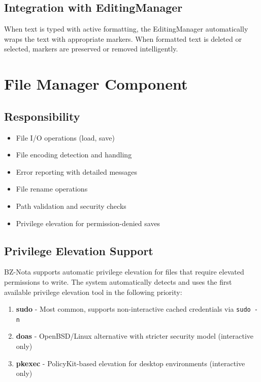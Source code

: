 \documentclass[12pt,a4paper,oneside,openany]{report}
\begin{document}
\subsection{Integration with EditingManager}

When text is typed with active formatting, the EditingManager automatically wraps the text with appropriate markers. When formatted text is deleted or selected, markers are preserved or removed intelligently.

\section{File Manager Component}

\subsection{Responsibility}

\begin{itemize}
	\item File I/O operations (load, save)
	\item File encoding detection and handling
	\item Error reporting with detailed messages
	\item File rename operations
	\item Path validation and security checks
	\item Privilege elevation for permission-denied saves
\end{itemize}

\subsection{Privilege Elevation Support}

BZ-Nota supports automatic privilege elevation for files that require elevated permissions to write. The system automatically detects and uses the first available privilege elevation tool in the following priority:

\begin{enumerate}
	\item \textbf{sudo} - Most common, supports non-interactive cached credentials via \texttt{sudo -n}
	\item \textbf{doas} - OpenBSD/Linux alternative with stricter security model (interactive only)
	\item \textbf{pkexec} - PolicyKit-based elevation for desktop environments (interactive only)
\end{enumerate}
\end{document}
